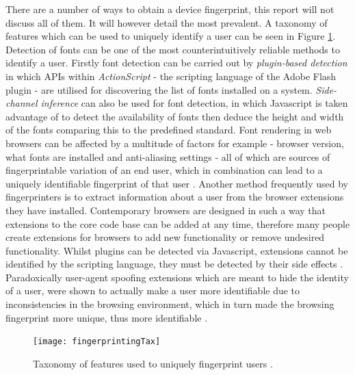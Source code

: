 \documentclass[12pt]{article}
\begin{document}
There are a number of ways to obtain a device fingerprint, this report will not discuss all of them. It will however detail the most prevalent. A taxonomy of features which can be used to uniquely identify a user can be seen in Figure \ref{fig:fingerprintingTax}. Detection of fonts can be one of the most counterintuitively reliable methods to identify a user. Firstly font detection can be carried out by \textit{plugin-based detection} in which APIs within \textit{ActionScript} - the scripting language of the Adobe Flash plugin - are utilised for discovering the list of fonts installed on a system. \textit{Side-channel inference} can also be used for font detection, in which Javascript is taken advantage of to detect the availability of fonts then deduce the height and width of the fonts comparing this to the predefined standard. Font rendering in web browsers can be affected by a multitude of factors for example - browser version, what fonts are installed and anti-aliasing settings - all of which are sources of fingerprintable variation of an end user, which in combination can lead to a uniquely identifiable fingerprint of that user \parencite{fingerprintFonts}. Another method frequently used by fingerprinters is to extract information about a user from the browser extensions they have installed. Contemporary browsers are designed in such a way that extensions to the core code base can be added at any time, therefore many people create extensions for browsers to add new functionality or remove undesired functionality. Whilst plugins can be detected via Javascript, extensions cannot be identified by the scripting language, they must be detected by their side effects \parencite{dustingFP}. Paradoxically user-agent spoofing extensions which are meant to hide the identity of a user, were shown to actually make a user more identifiable due to inconsistencies in the browsing environment, which in turn made the browsing fingerprint more unique, thus more identifiable  \parencite{cookielessMonster}. \\

\begin{figure}[H]
    \centering
    \texttt{[image: fingerprintingTax]}
    \caption{Taxonomy of features used to uniquely fingerprint users \parencite{cookielessMonster}.}
    \label{fig:fingerprintingTax}
\end{figure}
\end{document}
